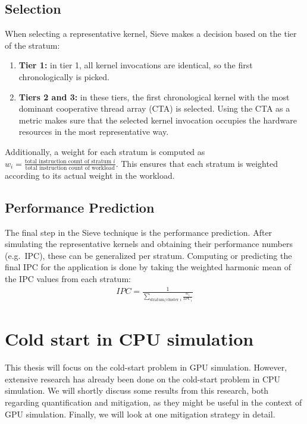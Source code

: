 \subsection{Selection}\label{subsec:selection}
When selecting a representative kernel, Sieve makes a decision based on the tier of the stratum:
\begin{enumerate}
    \item \textbf{Tier 1:} in tier 1, all kernel invocations are identical, so the first chronologically is picked.
    \item \textbf{Tiers 2 and 3:} in these tiers, the first chronological kernel with the most dominant cooperative thread array (CTA) is selected.
    Using the CTA as a metric makes sure that the selected kernel invocation occupies the hardware resources in the most representative way.
\end{enumerate}
Additionally, a weight for each stratum is computed as $w_i = \frac{\text{total instruction count of stratum }i}{\text{total instruction count of workload}}$.
This ensures that each stratum is weighted according to its actual weight in the workload.

\subsection{Performance Prediction}\label{subsec:pref-pred}
The final step in the Sieve technique is the performance prediction.
After simulating the representative kernels and obtaining their performance numbers (e.g.\ IPC), these can be generalized per stratum.
Computing or predicting the final IPC for the application is done by taking the weighted harmonic mean of the IPC values from each stratum:
\begin{align*}
    IPC = \frac{1}{\sum_{\text{stratum/cluster } i}{\frac{w_i}{IPC_i}}}
\end{align*}

\section{Cold start in CPU simulation}\label{sec:cold-start-in-cpu-simulation}
This thesis will focus on the cold-start problem in GPU simulation.
However, extensive research has already been done on the cold-start problem in CPU simulation.
We will shortly discuss some results from this research, both regarding quantification and mitigation, as they might be useful in the context of GPU simulation.
Finally, we will look at one mitigation strategy in detail.

